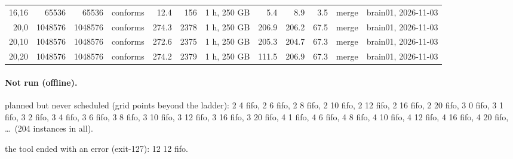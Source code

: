 \documentclass[10pt]{article}
\begin{document}
\begin{longtable}{@{}rrrlrrlrrrrl@{}}
\color{blue} 16,16 & 65536 & 65536 & conforms & 12.4 & 156 & 1 h, 250 GB & 5.4 & 8.9 & 3.5 & merge & brain01, 2026-11-03 \\
\color{blue} 20,0 & 1048576 & 1048576 & conforms & 274.3 & 2378 & 1 h, 250 GB & 206.9 & 206.2 & 67.5 & merge & brain01, 2026-11-03 \\
\color{blue} 20,10 & 1048576 & 1048576 & conforms & 272.6 & 2375 & 1 h, 250 GB & 205.3 & 204.7 & 67.3 & merge & brain01, 2026-11-03 \\
\color{blue} 20,20 & 1048576 & 1048576 & conforms & 274.2 & 2379 & 1 h, 250 GB & 111.5 & 206.9 & 67.3 & merge & brain01, 2026-11-03 \\
\bottomrule
\end{longtable}
\paragraph{Not run (offline).}
planned but never scheduled (grid points beyond the ladder): 2 4 fifo, 2 6 fifo, 2 8 fifo, 2 10 fifo, 2 12 fifo, 2 16 fifo, 2 20 fifo, 3 0 fifo, 3 1 fifo, 3 2 fifo, 3 4 fifo, 3 6 fifo, 3 8 fifo, 3 10 fifo, 3 12 fifo, 3 16 fifo, 3 20 fifo, 4 1 fifo, 4 6 fifo, 4 8 fifo, 4 10 fifo, 4 12 fifo, 4 16 fifo, 4 20 fifo, \ldots\ (204 instances in all).\par
the tool ended with an error (exit-127): 12 12 fifo.\par
\end{document}

